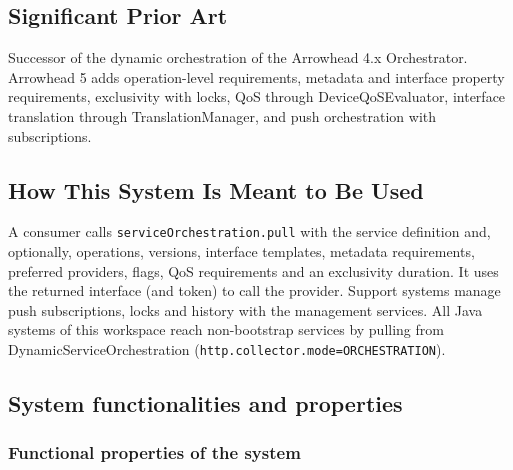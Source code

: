 \documentclass[a4paper]{arrowhead}
\begin{document}
\newpage

\subsection{Significant Prior Art}
\label{sec:prior_art}

Successor of the dynamic orchestration of the Arrowhead 4.x Orchestrator. Arrowhead 5 adds operation-level requirements, metadata and interface property requirements, exclusivity with locks, QoS through Device\allowbreak{}Qo\allowbreak{}SEvaluator, interface translation through Translation\allowbreak{}Manager, and push orchestration with subscriptions.

\subsection{How This System Is Meant to Be Used}
\label{sec:use}

A consumer calls \texttt{service\allowbreak{}Orchestration.\allowbreak{}pull} with the service definition and, optionally, operations, versions, interface templates, metadata requirements, preferred providers, flags, QoS requirements and an exclusivity duration. It uses the returned interface (and token) to call the provider. Support systems manage push subscriptions, locks and history with the management services. All Java systems of this workspace reach non-bootstrap services by pulling from Dynamic\allowbreak{}Service\allowbreak{}Orchestration (\texttt{http.\allowbreak{}collector.\allowbreak{}mode=\allowbreak{}ORCHESTRATION}).

\subsection{System functionalities and properties}
\label{sec:properties}

\subsubsection{Functional properties of the system}
\end{document}
